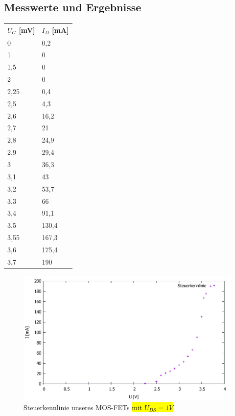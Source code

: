 \documentclass{scrartcl}
\begin{document}
\subsection{Messwerte und Ergebnisse}
\begin{table}[H]
\begin{center}
\begin{tabular}{l|l}

$U_G$ [mV]   &   $I_D$ [mA] \\
\hline
0	&0,2\\
1	&0\\
1,5	&0\\
2	&0\\
2,25&	0,4\\
2,5	&4,3\\
2,6	&16,2\\
2,7	&21\\
2,8	&24,9\\
2,9	&29,4\\
3	&36,3\\
3,1	&43\\
3,2	&53,7\\
3,3	&66\\
3,4	&91,1\\
3,5	&130,4\\
3,55&	167,3\\
3,6	&175,4\\
3,7	&190\\
\end{tabular}
\end{center}
\label{tab:mosfet_UG}
\end{table}
\begin{figure}[H]
  \centering
    \includegraphics[scale=0.5]{v4_steuer.pdf}
  \caption{Steuerkennlinie unseres MOS-FETs \hl{mit $U_{DS}=1V$}}
  \label{fig:Kennlinie_M_Gate}
\end{figure}
\end{document}
